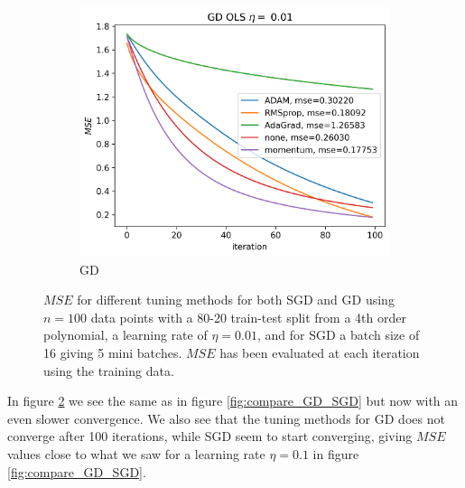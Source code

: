 \documentclass[11pt]{article}
\begin{document}
\begin{figure}[H]
\begin{subfigure}{.5\textwidth}
        \includegraphics[width=\textwidth]{../figures/GD_methods_OLS_eta_0.01.png}
        \caption{GD}
        \label{fig:}
    \end{subfigure}
    \caption{$MSE$ for different tuning methods for both SGD and GD using $n=100$ data points with a 80-20 train-test split from a 4th order polynomial, a learning rate of $\eta=0.01$, and for SGD a batch size of 16 giving 5 mini batches. $MSE$ has been evaluated at each iteration using the training data.}
    \label{fig:compare_GD_SGD_2}
\end{figure}
In figure \ref{fig:compare_GD_SGD_2} we see the same as in figure \ref{fig:compare_GD_SGD} but now with an even slower convergence. We also see that the tuning methods for GD does not converge after 100 iterations, while SGD seem to start converging, giving $MSE$ values close to what we saw for a learning rate $\eta =0.1$ in figure \ref{fig:compare_GD_SGD}.
\end{document}
